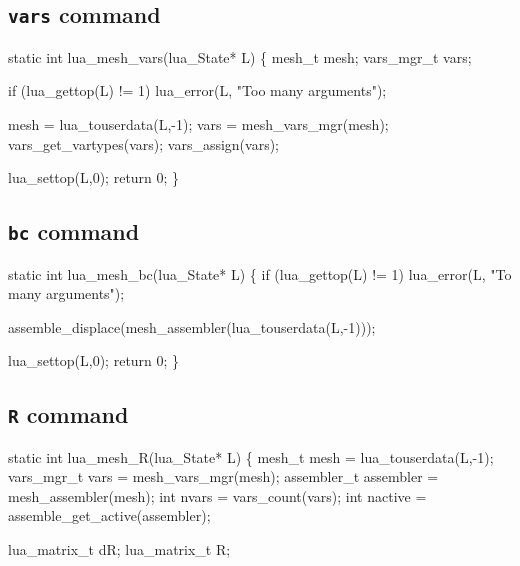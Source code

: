 \subsection{{\tt{}vars} command}

\nwenddocs{}\plusendmoddef
static int lua_mesh_vars(lua_State* L)
\{
    mesh_t     mesh;
    vars_mgr_t vars;

    if (lua_gettop(L) != 1)
        lua_error(L, "Too many arguments");

    mesh = lua_touserdata(L,-1);
    vars = mesh_vars_mgr(mesh);
    vars_get_vartypes(vars);
    vars_assign(vars);

    lua_settop(L,0);
    return 0;
\}

\nwendcode{}\nwdocspar


\subsection{{\tt{}bc} command}

\nwenddocs{}\plusendmoddef
static int lua_mesh_bc(lua_State* L)
\{
    if (lua_gettop(L) != 1)
        lua_error(L, "To many arguments");

    assemble_displace(mesh_assembler(lua_touserdata(L,-1)));

    lua_settop(L,0);
    return 0;
\}

\nwendcode{}\nwdocspar


\subsection{{\tt{}R} command}

\nwenddocs{}\plusendmoddef
static int lua_mesh_R(lua_State* L)
\{
    mesh_t      mesh      = lua_touserdata(L,-1);
    vars_mgr_t  vars      = mesh_vars_mgr(mesh);
    assembler_t assembler = mesh_assembler(mesh);
    int         nvars     = vars_count(vars);
    int         nactive   = assemble_get_active(assembler);

    lua_matrix_t dR;
    lua_matrix_t R;

